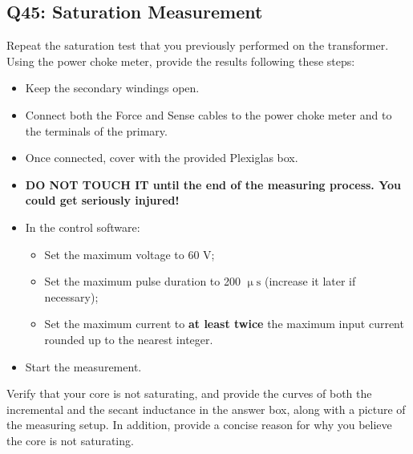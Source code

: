 \documentclass{PELsmallreport}
\begin{document}
\subsection{Q45: Saturation Measurement} 
Repeat the saturation test that you previously performed on the transformer.  
Using the power choke meter, provide the results following these steps: 
\begin{itemize}
    \item Keep the secondary windings open.
    \item Connect both the Force and Sense cables to the power choke meter and to the terminals of the primary.
    \item Once connected, cover with the provided Plexiglas box.
    \item \textbf{DO NOT TOUCH IT until the end of the measuring process. You could get seriously injured!}
    \item In the control software: 
    \begin{itemize}
        \item Set the maximum voltage to 60 V;
        \item Set the maximum pulse duration to 200 $\upmu \mathrm{s}$ (increase it later if necessary);
        \item Set the maximum current to \textbf{at least twice} the maximum input current rounded up to the nearest integer. 
    \end{itemize}
    \item Start the measurement.
\end{itemize}


Verify that your core is not saturating, and provide the curves of both the incremental and the secant inductance in the answer box, along with a picture of the measuring setup.
In addition, provide a concise reason for why you believe the core is not saturating. 
\end{document}
